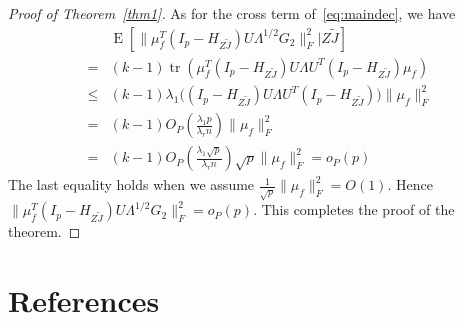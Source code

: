 \documentclass[review]{elsarticle}
\DeclareMathOperator{\mytr}{tr}
\DeclareMathOperator{\myE}{E}
\theoremstyle{plain}
\theoremstyle{definition}
\theoremstyle{remark}
\begin{document}
\begin{proof}[\textrm{Proof of Theorem~\ref{thm1}}]
As for the cross term of~\eqref{eq:maindec}, we have
$$
\begin{aligned}
    &\myE [\|\mu_f^T (I_p -H_{Z\tilde{J}})U\Lambda^{1/2}G_2\|_F^2|Z\tilde{J}]\\
    = &
    (k-1)\mytr(\mu_f^T (I_p -H_{Z\tilde{J}})U\Lambda U^T (I_p -H_{Z\tilde{J}})\mu_f)\\
    \leq &
    (k-1)\lambda_1\big((I_p -H_{Z\tilde{J}})U\Lambda U^T (I_p -H_{Z\tilde{J}})\big)\|\mu_f\|^2_F\\
    = &
    (k-1) O_P(\frac{\lambda_1 p}{\lambda_r n})  \|\mu_f\|^2_F\\
    = &
    (k-1) O_P(\frac{\lambda_1 \sqrt{p}}{\lambda_r n}) \sqrt{p}  \|\mu_f\|^2_F=o_P(p)
\end{aligned}
$$
The last equality holds when we assume $\frac{1}{\sqrt{p}}\|\mu_f\|_F^2=O(1)$. Hence $\|\mu_f^T (I_p -H_{Z\tilde{J}})U\Lambda^{1/2}G_2\|_F^2=o_P(p)$.
This completes the proof of the theorem.

\end{proof}






\section*{References}


\end{document}
